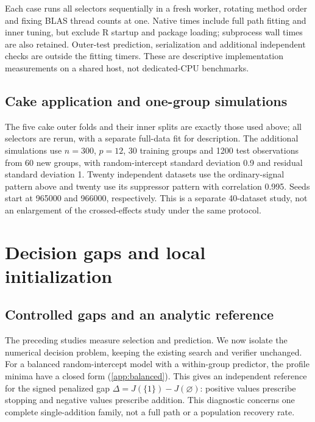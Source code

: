 \documentclass[preprint,11pt,numbers]{elsarticle}
\theoremstyle{remark}\newtheorem{remark}[theorem]{Remark}
\begin{document}
Each case runs all selectors sequentially in a fresh worker, rotating method
order and fixing BLAS thread counts at one. Native times include full path
fitting and inner tuning, but exclude R startup and package loading; subprocess
wall times are also retained. Outer-test prediction, serialization and additional
independent checks are outside the fitting timers. These are descriptive
implementation measurements on a shared host, not dedicated-CPU benchmarks.

\subsection{Cake application and one-group simulations}
The five cake outer folds and their inner splits are exactly those used above;
all selectors are rerun, with a separate full-data fit for description.
The additional simulations use $n=300$, $p=12$, 30 training groups and 1200
test observations from 60 new groups, with random-intercept standard deviation
0.9 and residual standard deviation 1. Twenty independent datasets use the
ordinary-signal pattern above and twenty use its suppressor pattern with
correlation 0.995. Seeds start at 965000 and 966000, respectively. This is a
separate 40-dataset study, not an enlargement of the crossed-effects study
under the same protocol.




\section{Decision gaps and local initialization}\label{sec:difficult}
\subsection{Controlled gaps and an analytic reference}
The preceding studies measure selection and prediction. We now isolate the
numerical decision problem, keeping the existing search and verifier unchanged.
For a balanced random-intercept model with a within-group predictor, the
profile minima have a closed form (\ref{app:balanced}). This gives an
independent reference for the signed penalized gap
$\Delta=J(\{1\})-J(\varnothing)$: positive values prescribe stopping and negative
values prescribe addition. This diagnostic concerns one complete single-addition
family, not a full path or a population recovery rate.
\end{document}
